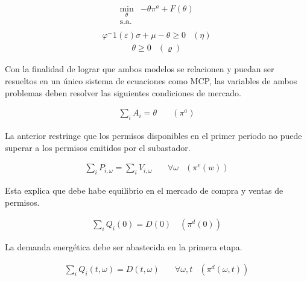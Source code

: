 \begin{equation}
\begin{array}{rrclcl}
    \displaystyle \min_{\theta} &-\theta \pi^a + F(\theta) \\\textrm{s.a.} \label{eq:sub}\\
\end{array}
\end{equation}
\begin{equation}
\begin{array}{cl}
    \varphi^-1 (\varepsilon )\sigma + \mu - \theta \geq 0 & (\eta) \label{res:sub1}
\end{array}
\end{equation}
\begin{equation}
\begin{array}{cl}
   \theta \geq 0 & (\varrho)\label{res:sub2}
\end{array}
\end{equation}

Con la finalidad de lograr que ambos modelos se relacionen y puedan ser resueltos en un único sistema de ecuaciones como MCP, las variables de ambos problemas deben resolver las siguientes condiciones de mercado.

\begin{align}
   \sum_{i}A_i = \theta  &\quad (\pi^a)\label{rescom:1}
\end{align}

La anterior restringe que los permisos disponibles en el primer periodo no puede superar a los permisos emitidos por el subastador.

\begin{align}
    \sum_{i}P_{i,\omega} = \sum_{i}V_{i,\omega} \quad& \forall \omega &(\pi^v (w))\label{rescom:2}
\end{align}
    


Esta explica que debe habe equilibrio en el mercado de compra y ventas de permisos.

\begin{align}
  \sum_{i}Q_i(0) = D(0) \quad (\pi^d (0))\label{rescom:3}  
\end{align}


La demanda energética debe ser abastecida en la primera etapa.

\begin{align}
    \sum_{i}Q_i(t,\omega) = D(t,\omega) \quad& \forall  \omega,t & (\pi^d (\omega,t))\label{rescom:4}
\end{align}


